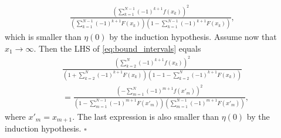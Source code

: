\documentclass[letterpaper, conference, 11pt]{IEEEtran}      %
\newcommand*{\QEDA}{\hfill\ensuremath{\square}}
\begin{document}
\begin{align*}
\frac{ \left(  \sum_{k=1}^{N-1} (-1)^{k+1}f(x_k) \right)^2} 
{\left( \sum_{k=1}^{N-1} (-1)^{k+1} F(x_k) \right)\left(1- \sum_{k=1}^{N-1} (-1)^{k+1} F(x_k)  \right) } ,
\end{align*}
which is smaller than $\eta(0)$ by the induction hypothesis. Assume now that $x_1 \rightarrow \infty$. Then the LHS of
\eqref{eq:bound_intervals} equals
\begin{align*}
& \frac{ \left(  \sum_{k=2}^{N} (-1)^{k+1}f(x_k) \right)^2} 
{\left( 1 + \sum_{k=2}^{N} (-1)^{k+1} F(x_k) \right)\left(1- 1 - \sum_{k=2}^{N} (-1)^{k+1} F(x_k)  \right) }  \\
& = \frac{ \left(  -\sum_{m=1}^{N} (-1)^{m+1}f(x'_m) \right)^2} 
{\left( 1 - \sum_{m=1}^{N-1} (-1)^{m+1} F(x'_{m}) \right)\left( \sum_{m=1}^{N-1} (-1)^{m+1} F(x'_{m})  \right) },
\end{align*}
where $x'_{m} = x_{m+1}$. The last expression is also smaller than $\eta(0)$ by the induction hypothesis. \QEDA \\
\end{document}
